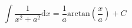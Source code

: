 $$ 
  \int \frac{1}{x^2 + a^2} \mathrm{d}x 
  = \frac{1}{a} \mathrm{arctan} \left ( \frac{x}{a} \right )
  + C
  $$
